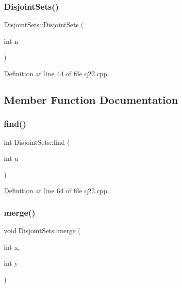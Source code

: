 \subsubsection{\texorpdfstring{Disjoint\+Sets()}{DisjointSets()}}
{\footnotesize\ttfamily Disjoint\+Sets\+::\+Disjoint\+Sets (\begin{DoxyParamCaption}\item[{int}]{n }\end{DoxyParamCaption})\hspace{0.3cm}{\ttfamily [inline]}}



Definition at line 44 of file q22.\+cpp.



\subsection{Member Function Documentation}
\mbox{\label{struct_disjoint_sets_a14ff5306079945dd59c0c6d55129ac2e}} 
\subsubsection{\texorpdfstring{find()}{find()}}
{\footnotesize\ttfamily int Disjoint\+Sets\+::find (\begin{DoxyParamCaption}\item[{int}]{u }\end{DoxyParamCaption})\hspace{0.3cm}{\ttfamily [inline]}}



Definition at line 64 of file q22.\+cpp.

\mbox{\label{struct_disjoint_sets_a349af3d249271920c355d9ef2a641f87}} 
\subsubsection{\texorpdfstring{merge()}{merge()}}
{\footnotesize\ttfamily void Disjoint\+Sets\+::merge (\begin{DoxyParamCaption}\item[{int}]{x,  }\item[{int}]{y }\end{DoxyParamCaption})\hspace{0.3cm}{\ttfamily [inline]}}



